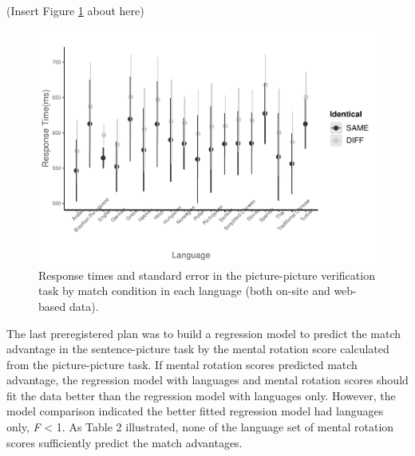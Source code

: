 \documentclass[
  man,floatsintext]{apa6}
\begin{document}
(Insert Figure \ref{fig:plot-PP-lme} about here)

\begin{figure}
\centering
\includegraphics{Stage2_Report_0824_files/figure-latex/plot-PP-lme-1.pdf}
\caption{\label{fig:plot-PP-lme}Response times and standard error in the picture-picture verification task by match condition in each language (both on-site and web-based data).}
\end{figure}

The last preregistered plan was to build a regression model to predict the match advantage in the sentence-picture task by the mental rotation score calculated from the picture-picture task. If mental rotation scores predicted match advantage, the regression model with languages and mental rotation scores should fit the data better than the regression model with languages only. However, the model comparison indicated the better fitted regression model had languages only, \emph{F} \textless{} 1. As Table 2 illustrated, none of the language set of mental rotation scores sufficiently predict the match advantages.
\end{document}
